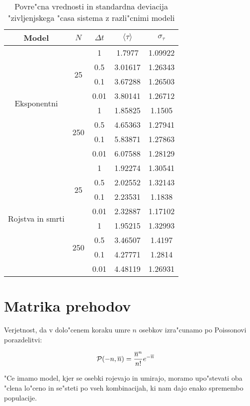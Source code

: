 \documentclass[a4paper,10pt]{article}
\begin{document}
\begin{table}[!h]
\centering
 \begin{tabular}{|c|c|c|c|c|}
  \hline 
Model & $N$ & $\Delta t$ & $\langle \tau \rangle$ & $\sigma_\tau$ \\
\hline
\multirow{8}{*}{Eksponentni} & \multirow{4}{*}{25} & 1 & 1.7977 & 1.09922 \\
& & 0.5 & 3.01617 & 1.26343 \\
& & 0.1 & 3.67288 & 1.26503 \\
& & 0.01 & 3.80141 & 1.26712 \\
\cline{2-5}
& \multirow{4}{*}{250} & 1 & 1.85825 & 1.1505 \\
& & 0.5 & 4.65363 & 1.27941\\
& & 0.1 & 5.83871 & 1.27863 \\
& & 0.01 & 6.07588 & 1.28129 \\
\hline
\multirow{8}{*}{Rojstva in smrti} & \multirow{4}{*}{25} & 1 & 1.92274 & 1.30541 \\
& & 0.5 & 2.02552 & 1.32143 \\
& & 0.1 & 2.23531 & 1.1838 \\
& & 0.01 & 2.32887 & 1.17102 \\
\cline{2-5}
& \multirow{4}{*}{250} & 1 & 1.95215 & 1.32993 \\
& & 0.5 & 3.46507 & 1.4197 \\
& & 0.1 & 4.27771 & 1.2814 \\
& & 0.01 & 4.48119 & 1.26931 \\
\hline
 \end{tabular}
\caption{Povre"cna vrednosti in standardna deviacija "zivljenjskega "casa sistema z razli"cnimi modeli}
\label{tab:stat-iz}
\end{table}


\section{Matrika prehodov}

Verjetnost, da v dolo"cenem koraku umre $n$ osebkov izra"cunamo po Poissonovi porazdelitvi:

\begin{align}
\mathcal P(-n, \overline n) &= \frac{\overline{n}^{n}}{n!} e^{-\overline{n}}
\end{align}

"Ce imamo model, kjer se osebki rojevajo in umirajo, moramo upo"stevati oba "clena lo"ceno in se"steti po vseh kombinacijah, ki nam dajo enako spremembo populacije. 
\end{document}
